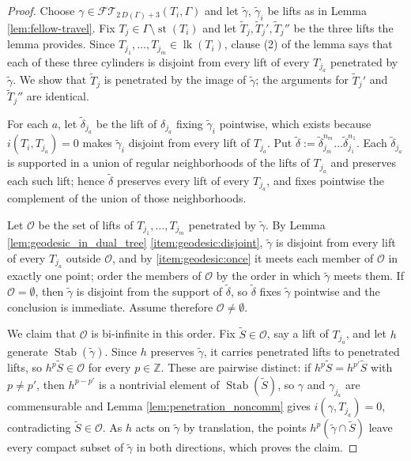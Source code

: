 \documentclass[12pt,a4paper]{amsart}
\numberwithin{equation}{section}
\newcommand{\ZZ}{\mathbb{Z}}
\theoremstyle{plain}
\theoremstyle{definition}
\theoremstyle{remark}
\begin{document}
\begin{proof}
    Choose $\gamma \in \mathcal{FT}\!_{2\,D(\Gamma)+3}(T_i, \Gamma)$ and let $\tilde\gamma$, $\tilde\gamma_i$ be lifts as in Lemma \ref{lem:fellow-travel}.
    Fix $T_j \in \Gamma \setminus \operatorname{st}(T_i)$ and let $\tilde T_j, \tilde T_j', \tilde T_j''$ be the three lifts the lemma provides.
    Since $T_{j_1}, \dots, T_{j_m} \in \operatorname{lk}(T_i)$, clause (2) of the lemma says that each of these three cylinders is disjoint from every lift of every $T_{j_a}$ penetrated by $\tilde\gamma$.
    We show that $\tilde T_j$ is penetrated by the image of $\tilde\gamma$; the arguments for $\tilde T_j'$ and $\tilde T_j''$ are identical.

    For each $a$, let $\tilde\delta_{j_a}$ be the lift of $\delta_{j_a}$ fixing $\tilde\gamma_i$ pointwise, which exists because $i(T_i, T_{j_a}) = 0$ makes $\tilde\gamma_i$ disjoint from every lift of $T_{j_a}$.
    Put $\tilde\delta := \tilde\delta_{j_m}^{n_m} \dots \tilde\delta_{j_1}^{n_1}$.
    Each $\tilde\delta_{j_a}$ is supported in a union of regular neighborhoods of the lifts of $T_{j_a}$ and preserves each such lift; hence $\tilde\delta$ preserves every lift of every $T_{j_a}$, and fixes pointwise the complement of the union of those neighborhoods.

    Let $\mathcal{O}$ be the set of lifts of $T_{j_1}, \dots, T_{j_m}$ penetrated by $\tilde\gamma$.
    By Lemma \ref{lem:geodesic_in_dual_tree} \eqref{item:geodesic:disjoint}, $\tilde\gamma$ is disjoint from every lift of every $T_{j_a}$ outside $\mathcal{O}$, and by \eqref{item:geodesic:once} it meets each member of $\mathcal{O}$ in exactly one point; order the members of $\mathcal{O}$ by the order in which $\tilde\gamma$ meets them.
    If $\mathcal{O} = \emptyset$, then $\tilde\gamma$ is disjoint from the support of $\tilde\delta$, so $\tilde\delta$ fixes $\tilde\gamma$ pointwise and the conclusion is immediate.
    Assume therefore $\mathcal{O} \ne \emptyset$.

    We claim that $\mathcal{O}$ is bi-infinite in this order.
    Fix $\tilde S \in \mathcal{O}$, say a lift of $T_{j_a}$, and let $h$ generate $\operatorname{Stab}(\tilde\gamma)$.
    Since $h$ preserves $\tilde\gamma$, it carries penetrated lifts to penetrated lifts, so $h^p \tilde S \in \mathcal{O}$ for every $p \in \ZZ$.
    These are pairwise distinct: if $h^p \tilde S = h^{p'} \tilde S$ with $p \ne p'$, then $h^{p - p'}$ is a nontrivial element of $\operatorname{Stab}(\tilde S)$, so $\gamma$ and $\gamma_{j_a}$ are commensurable and Lemma \ref{lem:penetration_noncomm} gives $i(\gamma, T_{j_a}) = 0$, contradicting $\tilde S \in \mathcal{O}$.
    As $h$ acts on $\tilde\gamma$ by translation, the points $h^p(\tilde\gamma \cap \tilde S)$ leave every compact subset of $\tilde\gamma$ in both directions, which proves the claim.


\end{proof}
\end{document}
